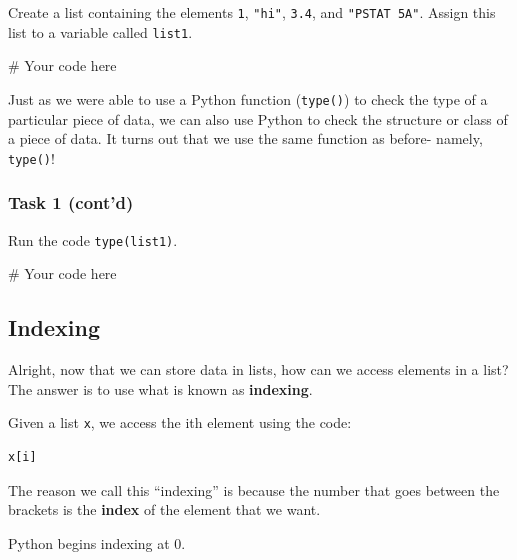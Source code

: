 \documentclass[
  11pt,
]{article}
\newenvironment{Shaded}{\begin{snugshade}}{\end{snugshade}}
\newcommand{\CommentTok}[1]{\textcolor[rgb]{0.37,0.37,0.37}{#1}}
\begin{document}
Create a list containing the elements \texttt{1}, \texttt{"hi"},
\texttt{3.4}, and \texttt{"PSTAT\ 5A"}. Assign this list to a variable
called \texttt{list1}.

\begin{Shaded}
\begin{Highlighting}[]
\CommentTok{\# Your code here}
\end{Highlighting}
\end{Shaded}

Just as we were able to use a Python function (\texttt{type()}) to check
the type of a particular piece of data, we can also use Python to check
the structure or class of a piece of data. It turns out that we use the
same function as before- namely, \texttt{type()}!

\subsubsection{Task 1 (cont'd)}\label{task-1-contd}

Run the code \texttt{type(list1)}.

\begin{Shaded}
\begin{Highlighting}[]
\CommentTok{\# Your code here}
\end{Highlighting}
\end{Shaded}

\subsection{Indexing}\label{indexing}

Alright, now that we can store data in lists, how can we access elements
in a list? The answer is to use what is known as \textbf{indexing}.

Given a list \texttt{x}, we access the ith element using the code:

\begin{verbatim}
x[i]
\end{verbatim}

The reason we call this ``indexing'' is because the number that goes
between the brackets is the \textbf{index} of the element that we want.

\begin{tcolorbox}[enhanced jigsaw, bottomrule=.15mm, colframe=quarto-callout-warning-color-frame, coltitle=black, left=2mm, title=\textcolor{quarto-callout-warning-color}{\faExclamationTriangle}\hspace{0.5em}{Caution}, opacityback=0, opacitybacktitle=0.6, leftrule=.75mm, breakable, bottomtitle=1mm, toprule=.15mm, rightrule=.15mm, arc=.35mm, titlerule=0mm, colback=white, toptitle=1mm, colbacktitle=quarto-callout-warning-color!10!white]

Python begins indexing at 0.

\end{tcolorbox}
\end{document}
